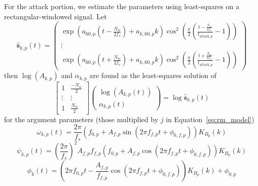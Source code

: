 For the attack portion, we estimate the parameters using least-squares on a
rectangular-windowed signal. Let
\begin{equation}
    \hat{\mathbf{s}}_{k,p}(t) =
    \begin{pmatrix}
        \exp \left(\displaystyle a_{60,p} \left( t - \frac{N_{w}}{2f_{s}} \right)  +
        a_{k,60,p} k \right) \cos^{2} \left(\displaystyle \frac{\pi}{2} \left(
                \frac{ t
        - \frac{N_{w}}{2f_{s}} }{ t_{\text{attack},p}} - 1 \right) \right)  \\
        \vdots \\
        \exp \left(\displaystyle a_{60,p} \left( t + \frac{N_{w}}{2f_{s}} \right)  +
        a_{k,60,p} k \right) \cos^{2} \left(\displaystyle \frac{\pi}{2} \left(
                \frac{ t
        + \frac{N_{w}}{2f_{s}}  }{ t_{\text{attack},p}} - 1 \right) \right)
    \end{pmatrix}
\end{equation}
then $\log(A_{k,p})$ and $\alpha_{k,p}$ are found as the least-squares solution of
\begin{equation}
    \begin{bmatrix}
        1 & \frac{-N_{w}}{2} \\
        \vdots & \vdots \\
        1 & \frac{N_{w}}{2}
    \end{bmatrix}
    \begin{pmatrix}
        \log(A_{k,p}(t)) \\
        \alpha_{k,p}(t)
    \end{pmatrix}
    = \log{\hat{\mathbf{s}}_{k,p}(t)}
\end{equation}
for the argument parameters (those multiplied by $j$ in Equation~\eqref{eq:rm_model})
\begin{equation}
    \omega_{k,p} \left( t \right)  = \frac{2 \pi}{f_{s}}  \left(  f_{0,p} +
    A_{f,p} \sin \left( 2 \pi f_{f,p} t + \phi_{0,f,p} \right)  \right)
    K_{B_{p}} \left( k \right) 
\end{equation}
\begin{equation}
    \psi_{k,p} \left( t \right)  =  \left( \frac{2 \pi}{f_{s}} \right) ^{2}
    A_{f,p} f_{f,p}  \left(  f_{0,p} + A_{f,p} \cos \left( 2 \pi f_{f,p} t +
    \phi_{0,f,p} \right)  \right)  K_{B_{p}} \left( k \right) 
\end{equation}
\begin{equation}
    \phi_{k} \left( t \right)  =  \left( 2\pi f_{0,p}t - \frac{A_{f,p}}{f_{f,p}}
    \cos \left( 2\pi f_{f,p} t + \phi_{0,f,p} \right)  \right)  K_{B_{p}} \left(
    k \right)  + \phi_{0,p}
\end{equation}

